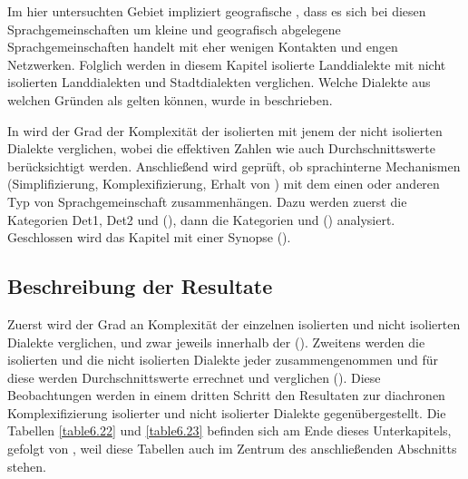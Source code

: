 Im hier untersuchten Gebiet impliziert geografische , dass es sich bei diesen Sprachgemeinschaften um kleine und geografisch abgelegene Sprachgemeinschaften handelt mit eher wenigen Kontakten und engen Netzwerken. Folglich werden in diesem Kapitel isolierte Landdialekte mit nicht isolierten Landdialekten und Stadtdialekten verglichen. Welche Dialekte aus welchen Gründen als  gelten können, wurde in  beschrieben.

In  wird der Grad der Komplexität der isolierten mit jenem der nicht isolierten Dialekte verglichen, wobei die effektiven Zahlen wie auch Durchschnittswerte berücksichtigt werden. Anschließend wird geprüft, ob sprachinterne Mechanismen (Simplifizierung, Komplexifizierung, Erhalt von ) mit dem einen oder anderen Typ von Sprachgemeinschaft zusammenhängen. Dazu werden zuerst die Kategorien Det1, Det2 und  (), dann die Kategorien  und  () analysiert. Geschlossen wird das Kapitel mit einer Synopse ().

\subsection{Beschreibung der Resultate}\label{6.5.1}

Zuerst wird der Grad an Komplexität der einzelnen isolierten und nicht isolierten Dialekte verglichen, und zwar jeweils innerhalb der  (). Zweitens werden die isolierten und die nicht isolierten Dialekte jeder  zusammengenommen und für diese werden Durchschnittswerte errechnet und verglichen (). Diese Beobachtungen werden in einem dritten Schritt den Resultaten zur diachronen Komplexifizierung isolierter und nicht isolierter Dialekte gegenübergestellt. Die Tabellen \ref{table6.22} und \ref{table6.23} befinden sich am Ende dieses Unterkapitels, gefolgt von , weil diese Tabellen auch im Zentrum des anschließenden Abschnitts  stehen.

